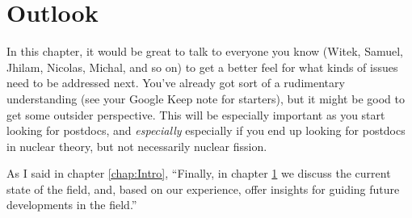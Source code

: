 \chapter{Outlook}\label{chap:Outlook}
\maketitle

In this chapter, it would be great to talk to everyone you know (Witek, Samuel, Jhilam, Nicolas, Michal, and so on) to get a better feel for what kinds of issues need to be addressed next. You've already got sort of a rudimentary understanding (see your Google Keep note for starters), but it might be good to get some outsider perspective. This will be especially important as you start looking for postdocs, and \textit{especially} especially if you end up looking for postdocs in nuclear theory, but not necessarily nuclear fission.

As I said in chapter \ref{chap:Intro}, ``Finally, in chapter \ref{chap:Outlook} we discuss the current state of the field, and, based on our experience, offer insights for guiding future developments in the field.''